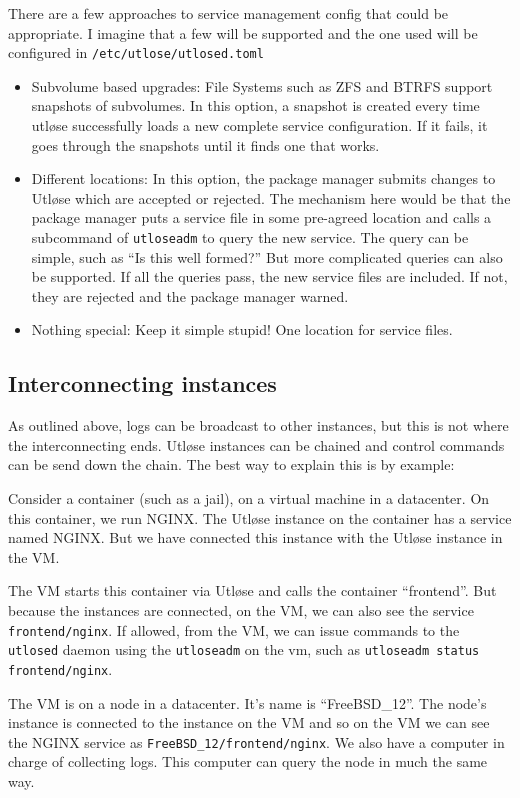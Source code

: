 \documentclass{article}
\begin{document}
There are a few approaches to service management config that could be appropriate. I imagine that a few will be supported and
the one used will be configured in \texttt{/etc/utlose/utlosed.toml}

\begin{itemize}
  \item{Subvolume based upgrades: File Systems such as ZFS and BTRFS support snapshots of subvolumes. In this option, a snapshot is created
    every time utløse successfully loads a new complete service configuration. If it fails, it goes through the snapshots until it finds one that
    works.}
  \item{Different locations: In this option, the package manager submits changes to Utløse which are accepted or rejected. The mechanism here would be
    that the package manager puts a service file in some pre-agreed location and calls a subcommand of \texttt{utloseadm} to query the new service.
    The query can be simple, such as ``Is this well formed?'' But more complicated queries can also be supported. If all the queries pass, the new service
    files are included. If not, they are rejected and the package manager warned.}
  \item{Nothing special: Keep it simple stupid! One location for service files.}
\end{itemize}

\subsection{Interconnecting instances}
As outlined above, logs can be broadcast to other instances, but this is not where the interconnecting ends. Utløse instances
can be chained and control commands can be send down the chain. The best way to explain this is by example:

Consider a container (such as a jail), on a virtual machine in a datacenter. On this container, we run NGINX.
The Utløse instance on the container has a service named NGINX. But we have connected this instance with the Utløse instance
in the VM.

The VM starts this container via Utløse and calls the container ``frontend''. But because the instances are connected,
on the VM, we can also see the service \texttt{frontend/nginx}. If allowed, from the VM, we can issue commands to the \texttt{utlosed}
daemon using the \texttt{utloseadm} on the vm, such as \texttt{utloseadm status frontend/nginx}.

The VM is on a node in a datacenter. It's name is ``FreeBSD\_12''. The node's instance is connected to the instance on the VM and so
on the VM we can see the NGINX service as \texttt{FreeBSD\_12/frontend/nginx}. We also have a computer in charge of collecting logs.
This computer can query the node in much the same way.
\end{document}
